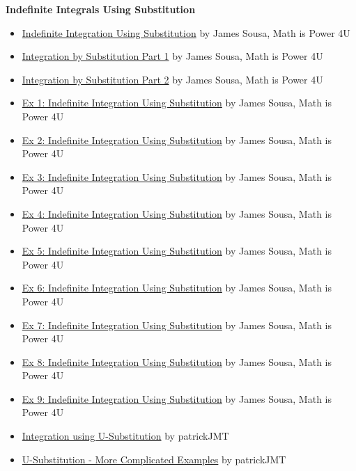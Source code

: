 \textbf{Indefinite Integrals Using Substitution}
\begin{itemize}
    \item \href{https://www.youtube.com/watch?v=568hUU4beuk}{Indefinite Integration Using Substitution} by James Sousa, Math is Power 4U
    \item \href{https://youtu.be/VfvJ5C9FjcA}{Integration by Substitution Part 1} by James Sousa, Math is Power 4U
    \item \href{https://youtu.be/pmekyFVIorE}{Integration by Substitution Part 2} by James Sousa, Math is Power 4U
    \item \href{https://www.youtube.com/watch?v=3MbdmYeYB_I}{Ex 1: Indefinite Integration Using Substitution} by James Sousa, Math is Power 4U
    \item \href{https://www.youtube.com/watch?v=xLtPL1Td5f4}{Ex 2: Indefinite Integration Using Substitution} by James Sousa, Math is Power 4U
    \item \href{https://www.youtube.com/watch?v=Cdk-3H35TrY}{Ex 3: Indefinite Integration Using Substitution} by James Sousa, Math is Power 4U
    \item \href{https://www.youtube.com/watch?v=hauyUjzRTos}{Ex 4: Indefinite Integration Using Substitution} by James Sousa, Math is Power 4U
    \item \href{https://www.youtube.com/watch?v=902ta0Kshoc}{Ex 5: Indefinite Integration Using Substitution} by James Sousa, Math is Power 4U
    \item \href{https://www.youtube.com/watch?v=FJHHQdQEecE}{Ex 6: Indefinite Integration Using Substitution} by James Sousa, Math is Power 4U
    \item \href{https://www.youtube.com/watch?v=VY5r1-9apdc}{Ex 7: Indefinite Integration Using Substitution} by James Sousa, Math is Power 4U
    \item \href{https://www.youtube.com/watch?v=UnND2S4IQSA}{Ex 8: Indefinite Integration Using Substitution} by James Sousa, Math is Power 4U
    \item \href{https://www.youtube.com/watch?v=CVfe5vNy4y4}{Ex 9: Indefinite Integration Using Substitution} by James Sousa, Math is Power 4U
\end{itemize}

\begin{itemize}
    \item \href{https://youtu.be/qclrs-1rpKI}{Integration using U-Substitution} by patrickJMT
    \item \href{https://youtu.be/x06V9xuLdqg}{U-Substitution - More Complicated Examples} by patrickJMT
\end{itemize}

